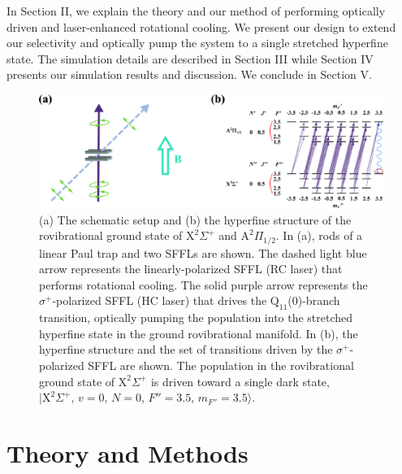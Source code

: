 \documentclass[twoside,twocolumn,9pt]{article}
\begin{document}

  In Section II, we explain the theory and our method of performing optically driven and laser-enhanced rotational cooling. We  present our design to extend our selectivity and optically pump the system to a single stretched hyperfine state. The simulation details are described in Section III while Section IV presents our simulation results and discussion. We conclude in Section V.\par


\begin{figure}[!htp]
 \centering
 \includegraphics[width=14cm]{schematic_setup}
 \caption{(a) The schematic setup and (b) the hyperfine structure of the rovibrational ground state of $\mathrm{X}^2\Sigma^+$ and $\mathrm{A}^2\Pi_{1/2}$. In (a), rods of a linear Paul trap and two SFFLs are shown. The dashed light blue arrow represents the linearly-polarized SFFL (RC laser) that performs rotational cooling. The solid purple arrow represents the $\sigma^+$-polarized SFFL (HC laser) that drives the $\mathrm{Q}_{11}$(0)-branch transition, optically pumping the population into the stretched hyperfine state in the ground rovibrational manifold. In (b), the hyperfine structure and the set of transitions driven by the $\sigma^+$-polarized SFFL are shown. The population in the rovibrational ground state of $\mathrm{X}^2\Sigma^+$ is driven toward a single dark state, $\lvert \mathrm{X}^2\Sigma^+,\, v=0,\, N=0,\, F''=3.5,\, m_{F''}=3.5\rangle$.}
 \label{schematic_setup}
\end{figure}

\section{Theory and Methods}
\end{document}

